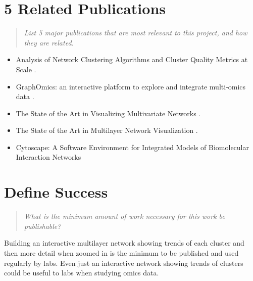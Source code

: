 \documentclass{proc}
\begin{document}
\section{5 Related Publications}
\begin{quote}
\textit{List 5 major publications that are most relevant to this project, and how they are related.}
\end{quote}

\begin{itemize}
    \item Analysis of Network Clustering Algorithms and Cluster Quality Metrics at Scale \cite{emmons2016analysis}.
    \item GraphOmics: an interactive platform to explore and integrate multi-omics data \cite{wandy2021graphomics}.
    \item The State of the Art in Visualizing Multivariate Networks \cite{nobre2019state}.
    \item The State of the Art in Multilayer Network Visualization \cite{mcgee2019state}.
    \item Cytoscape: A Software Environment for Integrated Models of Biomolecular Interaction Networks \cite{shannon2003cytoscape}
\end{itemize}

\section{Define Success}
\begin{quote}
\textit{What is the minimum amount of work necessary for this work be publishable?}
\end{quote}

Building an interactive multilayer network showing trends of each cluster and then more detail when zoomed in is the minimum to be published and used regularly by labs. Even just an interactive network showing trends of clusters could be useful to labs when studying omics data.



\end{document}
